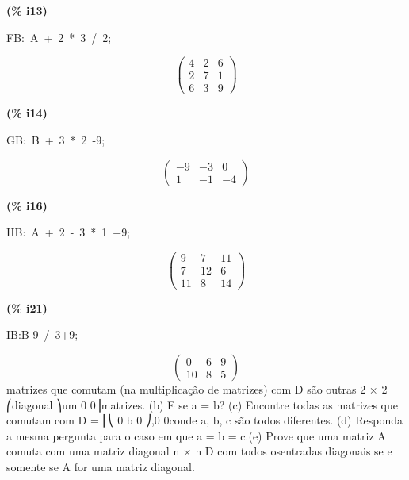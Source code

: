 \documentclass[fleqn]{article}
\begin{document}
\noindent
\begin{minipage}[t]{4.000000em}\color{red}\bfseries
(\% i13)	
\end{minipage}
\begin{minipage}[t]{\textwidth}\color{blue}
FB:\ A\ +\ 2\ *\ 3\ /\ 2;
\end{minipage}
\[\displaystyle \tag{FB} 
\begin{pmatrix}4 & 2 & 6\\
2 & 7 & 1\\
6 & 3 & 9\end{pmatrix}\mbox{}
\]


\noindent
\begin{minipage}[t]{4.000000em}\color{red}\bfseries
(\% i14)	
\end{minipage}
\begin{minipage}[t]{\textwidth}\color{blue}
GB:\ B\ +\ 3\ *\ 2\ -9;
\end{minipage}
\[\displaystyle \tag{GB} 
\begin{pmatrix}\mathop{-}9 & \mathop{-}3 & 0\\
1 & \mathop{-}1 & \mathop{-}4\end{pmatrix}\mbox{}
\]


\noindent
\begin{minipage}[t]{4.000000em}\color{red}\bfseries
(\% i16)	
\end{minipage}
\begin{minipage}[t]{\textwidth}\color{blue}
HB:\ A\ +\ 2\ -\ 3\ *\ 1\ +9;
\end{minipage}
\[\displaystyle \tag{HB} 
\begin{pmatrix}9 & 7 & 11\\
7 & 12 & 6\\
11 & 8 & 14\end{pmatrix}\mbox{}
\]


\noindent
\begin{minipage}[t]{4.000000em}\color{red}\bfseries
(\% i21)	
\end{minipage}
\begin{minipage}[t]{\textwidth}\color{blue}
IB:B-9\ /\ 3+9;
\end{minipage}
\[\displaystyle \tag{IB} 
\begin{pmatrix}0 & 6 & 9\\
10 & 8 & 5\end{pmatrix}\mbox{}
\]
matrizes que comutam (na multiplicação de matrizes) com D são outras 2 × 2 ⎛diagonal ⎞um 0 0⎟matrizes. (b) E se a = b? (c) Encontre todas as matrizes que comutam com D = ⎜⎝ 0 b 0 ⎠,0 0conde a, b, c são todos diferentes. (d) Responda a mesma pergunta para o caso em que a = b = c.(e) Prove que uma matriz A comuta com uma matriz diagonal n × n D com todos osentradas diagonais se e somente se A for uma matriz diagonal.
\end{document}
